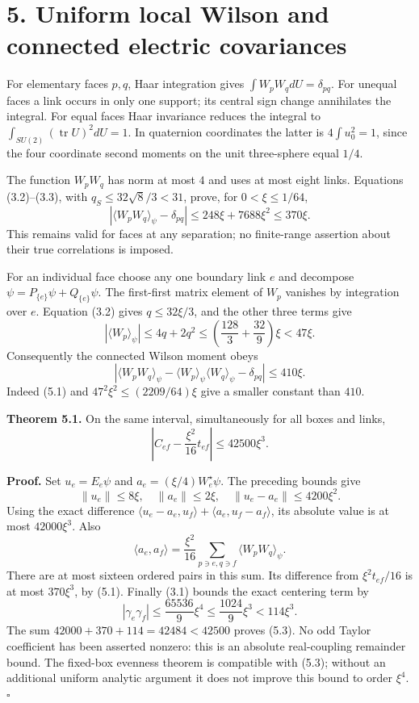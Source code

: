 \documentclass[
]{article}
\begin{document}
\section{5. Uniform local Wilson and connected electric
covariances}\label{uniform-local-wilson-and-connected-electric-covariances}

For elementary faces \(p,q\), Haar integration gives
\(\int W_pW_qdU=\delta_{pq}\). For unequal faces a link occurs in only
one support; its central sign change annihilates the integral. For equal
faces Haar invariance reduces the integral to
\(\int_{SU(2)}(\operatorname{tr}U)^2dU=1\). In quaternion coordinates
the latter is \(4\int u_0^2=1\), since the four coordinate second
moments on the unit three-sphere equal \(1/4\).

The function \(W_pW_q\) has norm at most \(4\) and uses at most eight
links. Equations (3.2)--(3.3), with \(q_S\le32\sqrt8/3<31\), prove, for
\(0<\xi\le1/64\), \[
|\langle W_pW_q\rangle_\psi-\delta_{pq}|
 \le248\xi+7688\xi^2\le370\xi.                              \tag{5.1}
\] This remains valid for faces at any separation; no finite-range
assertion about their true correlations is imposed.

For an individual face choose any one boundary link \(e\) and decompose
\(\psi=P_{\{e\}}\psi+Q_{\{e\}}\psi\). The first-first matrix element of
\(W_p\) vanishes by integration over \(e\). Equation (3.2) gives
\(q\le32\xi/3\), and the other three terms give \[
|\langle W_p\rangle_\psi|\le4q+2q^2
 \le\left(\frac{128}{3}+\frac{32}{9}\right)\xi<47\xi.
\] Consequently the connected Wilson moment obeys \[
|\langle W_pW_q\rangle_\psi
 -\langle W_p\rangle_\psi\langle W_q\rangle_\psi-\delta_{pq}|
 \le410\xi.                                                   \tag{5.2}
\] Indeed (5.1) and \(47^2\xi^2\le(2209/64)\xi\) give a smaller constant
than \(410\).

\textbf{Theorem 5.1.} On the same interval, simultaneously for all boxes
and links, \[
\left|C_{ef}-\frac{\xi^2}{16}t_{ef}\right|\le42500\xi^3.       \tag{5.3}
\]

\textbf{Proof.} Set \(u_e=E_e\psi\) and \(a_e=(\xi/4)W_e^{\star}\psi\).
The preceding bounds give \[
\|u_e\|\le8\xi,\quad \|a_e\|\le2\xi,\quad
\|u_e-a_e\|\le4200\xi^2.
\] Using the exact difference
\(\langle u_e-a_e,u_f\rangle+\langle a_e,u_f-a_f\rangle\), its absolute
value is at most \(42000\xi^3\). Also \[
\langle a_e,a_f\rangle
 =\frac{\xi^2}{16}\sum_{p\ni e,q\ni f}\langle W_pW_q\rangle_\psi.
\] There are at most sixteen ordered pairs in this sum. Its difference
from \(\xi^2t_{ef}/16\) is at most \(370\xi^3\), by (5.1). Finally (3.1)
bounds the exact centering term by \[
|\gamma_e\gamma_f|\le\frac{65536}{9}\xi^4
 \le\frac{1024}{9}\xi^3<114\xi^3.
\] The sum \(42000+370+114=42484<42500\) proves (5.3). No odd Taylor
coefficient has been asserted nonzero: this is an absolute real-coupling
remainder bound. The fixed-box evenness theorem is compatible with
(5.3); without an additional uniform analytic argument it does not
improve this bound to order \(\xi^4\). \(\square\)
\end{document}

